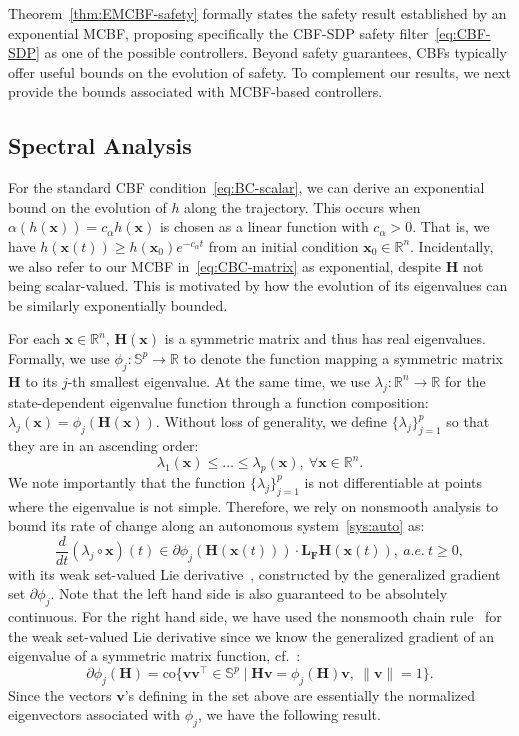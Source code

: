 \documentclass[10pt,twocolumn,twoside]{IEEEtran}
\newcommand{\real}{\mathbb{R}}
\newcommand{\map}[3]{#1:#2 \rightarrow #3}
\newcommand{\setdefb}[2]{\big\{#1 \; | \; #2\big\}}
\theoremstyle{definition}
\newcommand{\bv}{\mathbf{v}}
\newcommand{\bx}{\mathbf{x}}
\newcommand{\bF}{\mathbf{F}}
\newcommand{\bH}{\mathbf{H}}
\newcommand{\bL}{\mathbf{L}}
\begin{document}
Theorem~\ref{thm:EMCBF-safety} formally states the safety result established by an exponential MCBF, proposing specifically the CBF-SDP safety filter~\eqref{eq:CBF-SDP} as one of the possible controllers. Beyond safety guarantees, CBFs typically offer useful bounds on the evolution of safety. To complement our results, we next provide  the bounds associated with MCBF-based controllers.


\subsection{Spectral Analysis}
For the standard CBF condition~\eqref{eq:BC-scalar}, we can derive an exponential bound on the evolution of $h$ along the trajectory. This occurs when $\alpha(h(\bx))= c_\alpha h(\bx)$ is chosen as a linear function with $c_\alpha >0$. That is, we have $h(\bx(t))\geq h(\bx_0)e^{-c_\alpha t}$ from an initial condition $\bx_0\in\real^n$. Incidentally, we also refer to our MCBF in~\eqref{eq:CBC-matrix} as exponential, despite $\bH$ not being scalar-valued. This is motivated by how the evolution of its eigenvalues can be similarly exponentially bounded.

For each $\bx\in\real^n$, $\bH(\bx)$ is a symmetric matrix and thus has real eigenvalues. Formally, we use $\map{\phi_j}{\mathbb S^p}{\real}$ to denote the function mapping a symmetric matrix $\bH$ to its $j$-th smallest eigenvalue. At the same time, we use $\map{\lambda_j}{\real^n}{\real}$ for the state-dependent eigenvalue function through a function composition: $\lambda_j(\bx)=\phi_j(\bH(\bx))$. Without loss of generality, we define $\{\lambda_j\}_{j=1}^p$ so that they are in an ascending order:
\begin{equation}
    \lambda_1(\bx)\leq \dots \leq \lambda_p(\bx),~\forall \bx\in\real^n.
\end{equation}
We note importantly that the function $\{\lambda_j\}_{j=1}^p$ is not differentiable at points where the eigenvalue  is not simple. Therefore, we rely on nonsmooth analysis to bound its rate of change along an autonomous system~\eqref{sys:auto} as:
$$
    \frac{d}{dt}(\lambda_j\circ \bx)(t) \in \partial \phi_j (\bH(\bx(t))) \cdot \bL_\bF\bH(\bx(t)),  ~a.e.~t\geq0,
$$
with its weak set-valued Lie derivative~\cite[Lem. 1 and Rmk. 1]{PG-JC-ME:17}, constructed by the generalized gradient set $\partial\phi_j$. Note that the left hand side is also guaranteed to be absolutely continuous. For the right hand side, we have used the nonsmooth chain rule~\cite[Thm. 2.3.10]{FHC:83} for the weak set-valued Lie derivative since we know the generalized gradient of an eigenvalue of a symmetric matrix function, cf.~\cite{MDS-JC:09}:
$$
    \partial\phi_j(\bH) = \text{co}\setdefb{\bv\bv^\top \in \mathbb{S}^p}{\bH\bv=\phi_j(\bH)\bv,~\|\bv\| = 1}.
$$
Since the vectors $\bv$'s defining in the set above are essentially the normalized eigenvectors associated with $\phi_j$, we have the following result. 
\end{document}
